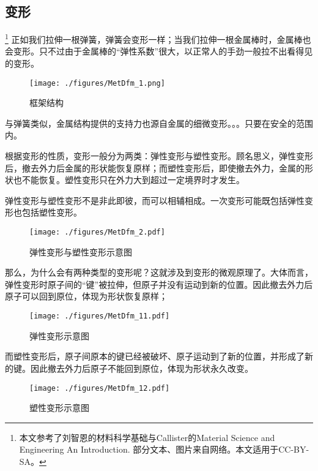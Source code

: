 
\subsection{变形}
\footnote{本文参考了刘智恩的材料科学基础与Callister的Material Science and Engineering An Introduction. 部分文本、图片来自网络。本文适用于CC-BY-SA。}
正如我们拉伸一根弹簧，弹簧会变形一样；当我们拉伸一根金属棒时，金属棒也会变形。只不过由于金属棒的“弹性系数”很大，以正常人的手劲一般拉不出看得见的变形。

\begin{example}{}
\begin{figure}[ht]
\centering
\texttt{[image: ./figures/MetDfm\_1.png]}
\caption{框架结构} \label{MetDfm_fig1}
\end{figure}
与弹簧类似，金属结构提供的支持力也源自金属的细微变形。。。只要在安全的范围内。
\end{example}

根据变形的性质，变形一般分为两类：弹性变形与塑性变形。顾名思义，弹性变形后，撤去外力后金属的形状能恢复原样；而塑性变形后，即使撤去外力，金属的形状也不能恢复。塑性变形只在外力大到超过一定境界时才发生。

弹性变形与塑性变形不是非此即彼，而可以相辅相成。一次变形可能既包括弹性变形也包括塑性变形。

\begin{figure}[ht]
\centering
\texttt{[image: ./figures/MetDfm\_2.pdf]}
\caption{弹性变形与塑性变形示意图} \label{MetDfm_fig2}
\end{figure}

那么，为什么会有两种类型的变形呢？这就涉及到变形的微观原理了。大体而言，弹性变形时原子间的“键”被拉伸，但原子并没有运动到新的位置。因此撤去外力后原子可以回到原位，体现为形状恢复原样；
\begin{figure}[ht]
\centering
\texttt{[image: ./figures/MetDfm\_11.pdf]}
\caption{弹性变形示意图} \label{MetDfm_fig11}
\end{figure}
而塑性变形后，原子间原本的键已经被破坏、原子运动到了新的位置，并形成了新的键。因此撤去外力后原子不能回到原位，体现为形状永久改变。
\begin{figure}[ht]
\centering
\texttt{[image: ./figures/MetDfm\_12.pdf]}
\caption{塑性变形示意图} \label{MetDfm_fig12}
\end{figure}

